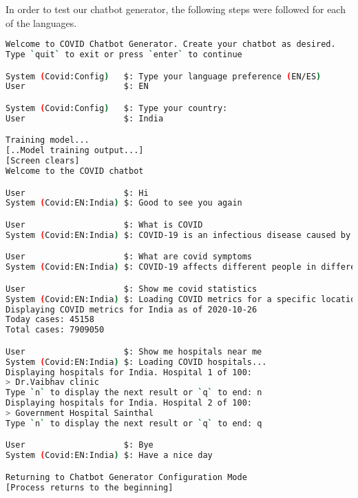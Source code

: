 \documentclass[]{article}
\begin{document}
In order to test our chatbot generator, the following steps were followed for each of the languages.

\begin{lstlisting}[language=bash, caption=English Chatbot Test Case, style=mybashcode]
Welcome to COVID Chatbot Generator. Create your chatbot as desired.
Type `quit` to exit or press `enter` to continue

System (Covid:Config)   $: Type your language preference (EN/ES)
User                    $: EN

System (Covid:Config)   $: Type your country:
User                    $: India

Training model...
[..Model training output...]
[Screen clears]
Welcome to the COVID chatbot

User                    $: Hi
System (Covid:EN:India) $: Good to see you again

User                    $: What is COVID
System (Covid:EN:India) $: COVID-19 is an infectious disease caused by severte acute respiratory syndome coronaravirus 2

User                    $: What are covid symptoms
System (Covid:EN:India) $: COVID-19 affects different people in different ways. Infected people have had a wide range of symptoms reported  from mild symptoms to severe illness.

User                    $: Show me covid statistics
System (Covid:EN:India) $: Loading COVID metrics for a specific location...
Displaying COVID metrics for India as of 2020-10-26
Today cases: 45158
Total cases: 7909050

User                    $: Show me hospitals near me
System (Covid:EN:India) $: Loading COVID hospitals...
Displaying hospitals for India. Hospital 1 of 100:
> Dr.Vaibhav clinic
Type `n` to display the next result or `q` to end: n
Displaying hospitals for India. Hospital 2 of 100:
> Government Hospital Sainthal
Type `n` to display the next result or `q` to end: q

User                    $: Bye
System (Covid:EN:India) $: Have a nice day

Returning to Chatbot Generator Configuration Mode
[Process returns to the beginning]

\end{lstlisting}
\end{document}
